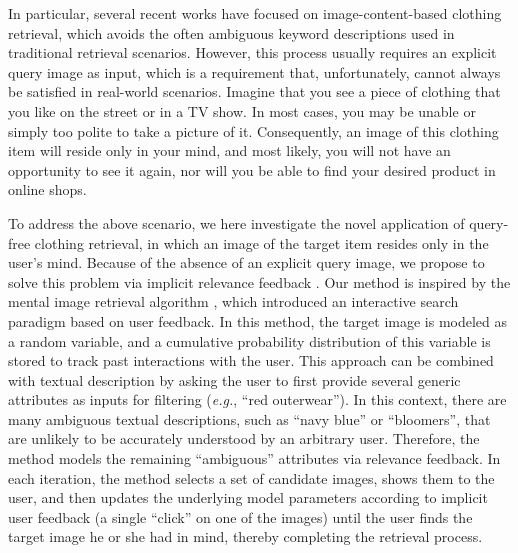 \documentclass[journal]{IEEEtran}
\begin{document}

In particular, several recent works \cite{wang2013personal,liu2012street,huang2015cross,hadi2015buy} have focused on image-content-based clothing retrieval, which avoids the often ambiguous keyword descriptions used in traditional retrieval scenarios. However, this process usually requires an explicit query image as input, which is a requirement that, unfortunately, cannot always be satisfied in real-world scenarios.
Imagine that you see a piece of clothing that you like on the street or in a TV show. In most cases, you may be unable or simply too polite to take a picture of it. Consequently, an image of this clothing item will reside only in your mind, and most likely, you will not have an opportunity to see it again, nor will you be able to find your desired product in online shops.%

To address the above scenario, we here investigate the novel application of query-free clothing retrieval, in which an image of the target item resides only in the user's mind. Because of the absence of an explicit query image, we propose to solve this problem via implicit relevance feedback \cite{zhou2003relevance}. Our method is inspired by the mental image retrieval algorithm \cite{fang2005experiments,ferecatu2007interactive,suditu2011heat,suditu2012iterative}, which introduced an interactive search paradigm based on user feedback. In this method, the target image is modeled as a random variable, and a cumulative probability distribution of this variable is stored to track past interactions with the user. This approach can be combined with textual description by asking the user to first provide several generic attributes as inputs for filtering (\textit{e.g.}, “red outerwear”). In this context, there are many ambiguous textual descriptions, such as “navy blue” or “bloomers”, that are unlikely to be accurately understood by an arbitrary user. Therefore, the method models the remaining “ambiguous” attributes via relevance feedback. In each iteration, the method selects a set of candidate images, shows them to the user, and then updates the underlying model parameters according to implicit user feedback (a single ``click'' on one of the images) until the user finds the target image he or she had in mind, thereby completing the retrieval process.
\end{document}
